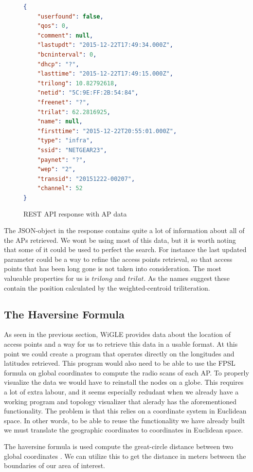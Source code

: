 	\begin{figure}[h]

	\begin{lstlisting}[language=json]
{
	"userfound": false,
	"qos": 0,
	"comment": null,
	"lastupdt": "2015-12-22T17:49:34.000Z",
	"bcninterval": 0,
	"dhcp": "?",
	"lasttime": "2015-12-22T17:49:15.000Z",
	"trilong": 10.82792618,
	"netid": "5C:9E:FF:2B:54:84",
	"freenet": "?",
	"trilat": 62.2816925,
	"name": null,
	"firsttime": "2015-12-22T20:55:01.000Z",
	"type": "infra",
	"ssid": "NETGEAR23",
	"paynet": "?",
	"wep": "2",
	"transid": "20151222-00207",
	"channel": 52
}

\end{lstlisting}
\caption{REST API response with AP data}
\label{fig:wigle}
\end{figure}

The JSON-object in the response contains quite a lot of information about all of the APs retrieved. We wont be using most of this data, but it is worth noting that some of it could be used to perfect the search. For instance the last updated parameter could
be a way to refine the access points retrieval, so that access points that has been long gone is not taken into consideration. The most valueable properties for us is $trilong$ and $trilat$. As the names suggest these contain the position calculated
by the weighted-centroid triliteration. 

\subsection{The Haversine Formula}
As seen in the previous section, WiGLE provides data about the location of access points and a way for us to retrieve this data in a usable format. 
At this point we could create a program that operates directly on the longitudes and latitudes retrieved. This program would also need to be able to use the FPSL formula on global coordinates to compute the radio scans of each AP. 
To properly visualize the data we would have to reinstall the nodes on a globe. This requires a lot of extra labour, and it seems especially redudant when we already have a working program and topology visualizer that alerady
has the aforementioned functionality. The problem is that this relies on a coordinate system in Euclidean space. In other words, to be able to reuse the functionality we have already built
we must translate the geographic coordinates to coordinates in Euclidean space.

The haversine formula is used compute the great-circle distance between two global coordinates \cite{Nichat}. We can utilize this to get the distance in meters
between the boundaries of our area of interest. 

